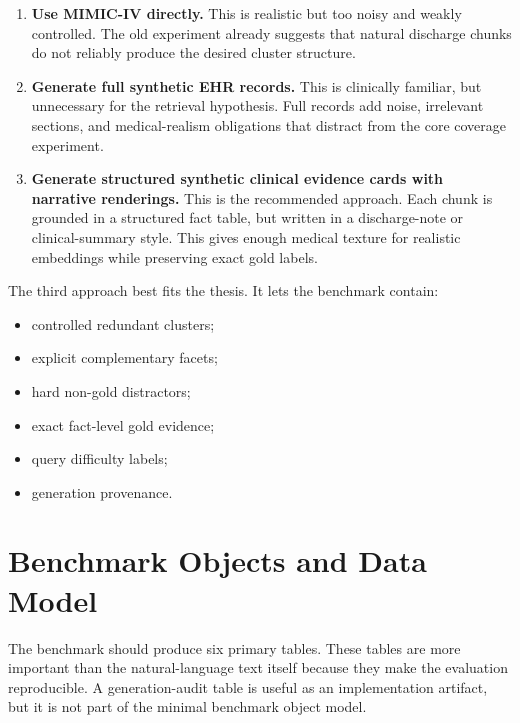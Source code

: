 \documentclass[11pt,a4paper]{article}
\begin{document}
\begin{enumerate}[leftmargin=*]
	\item \textbf{Use MIMIC-IV directly.} This is realistic but too noisy and weakly controlled. The old experiment already suggests that natural discharge chunks do not reliably produce the desired cluster structure.
	\item \textbf{Generate full synthetic EHR records.} This is clinically familiar, but unnecessary for the retrieval hypothesis. Full records add noise, irrelevant sections, and medical-realism obligations that distract from the core coverage experiment.
	\item \textbf{Generate structured synthetic clinical evidence cards with narrative renderings.} This is the recommended approach. Each chunk is grounded in a structured fact table, but written in a discharge-note or clinical-summary style. This gives enough medical texture for realistic embeddings while preserving exact gold labels.
\end{enumerate}

The third approach best fits the thesis. It lets the benchmark contain:

\begin{itemize}[leftmargin=*]
	\item controlled redundant clusters;
	\item explicit complementary facets;
	\item hard non-gold distractors;
	\item exact fact-level gold evidence;
	\item query difficulty labels;
	\item generation provenance.
\end{itemize}

\section{Benchmark Objects and Data Model}

The benchmark should produce six primary tables. These tables are more important than the natural-language text itself because they make the evaluation reproducible. A generation-audit table is useful as an implementation artifact, but it is not part of the minimal benchmark object model.
\end{document}
